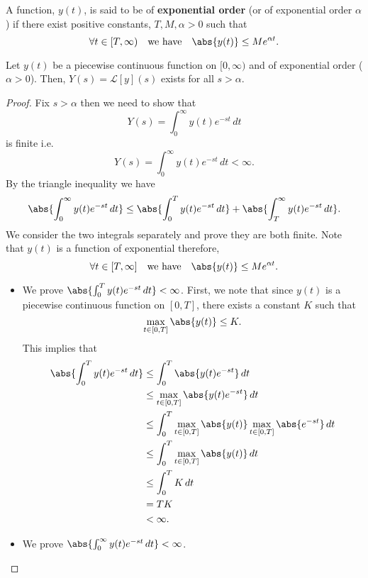 \documentclass[12pt, a4paper]{article}
\newcommand{\CL}{\mathcal{L}}
\begin{document}
\begin{definition}
    A function, \(y(t)\), is said to be of \textbf{exponential order} (or of exponential order \(\alpha\)) if there exist positive constants, \(T,M,\alpha >0\) such that 
    \[\forall t \in [T, \infty) \quad \text{we have} \quad \abs{y(t)} \leq Me^{\alpha t}.\]
\end{definition}

\begin{mdthm}
    Let \(y(t)\) be a piecewise continuous function on \([0,\infty)\) and of exponential order (\(\alpha>0\)). Then, \(Y(s) = \CL[y](s)\) exists for all \(s > \alpha\).
\end{mdthm}

\begin{proof}
    Fix \(s>\alpha\) then we need to show that
    \[Y(s) = \int_{0}^{\infty} y(t) e^{-st} \, dt\]
    is finite i.e. 
    \[Y(s) = \int_{0}^{\infty} y(t) e^{-st} \, dt < \infty.\]
    By the triangle inequality we have
    \[\abs{\int_{0}^{\infty} y(t) e^{-st} \, dt} \leq \abs{\int_{0}^{T} y(t) e^{-st} \, dt} + \abs{\int_{T}^{\infty} y(t) e^{-st} \, dt}.\]
    We consider the two integrals separately and prove they are both finite. Note that \(y(t)\) is a function of exponential therefore, 
    \[\forall t \in [T, \infty] \quad \text{we have} \quad \abs{y(t)} \leq Me^{\alpha t}.\]
    \begin{itemize}
        \item We prove \(\abs{\int_{0}^{T} y(t) e^{-st} \, dt} < \infty\).
        First, we note that since \(y(t)\) is a piecewise continuous function on \([0,T]\), there exists a constant \(K\) such that 
        \[\max_{t \in [0,T]} \abs{y(t)} \leq K.\]
        This implies that 
        \[\begin{aligned}
            \abs{\int_{0}^{T} y(t) e^{-st} \, dt} &\leq \int_{0}^{T} \abs{y(t) e^{-st}} \, dt \\
            &\leq \max_{t \in [0,T]} \abs{y(t) e^{-st}} \, dt \\
            &\leq \int_{0}^{T} \max_{t \in [0,T]}\abs{y(t)}\max_{t \in [0,T]} \abs{e^{-st}} \, dt \\
            &\leq \int_{0}^{T} \max_{t \in [0,T]}\abs{y(t)}\, dt \\
            &\leq \int_{0}^{T} K \, dt  \\
            &= TK \\
            &< \infty.
        \end{aligned}\]
        \item We prove \(\abs{\int_{0}^{\infty} y(t) e^{-st} \, dt} < \infty\).

\end{itemize}
\end{proof}
\end{document}
